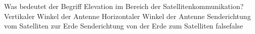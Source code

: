     {Was bedeutet der Begriff Elevation im Bereich der Satellitenkommunikation?}
    {Vertikaler Winkel der Antenne}
    {Horizontaler Winkel der Antenne}
    {Senderichtung vom Satelliten zur Erde}
    {Senderichtung von der Erde zum Satelliten}
    {false}{false}